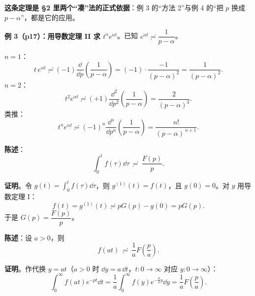 \documentclass[11pt]{ctexart}
\begin{document}
\textbf{这条定理是 §2 里两个“凑”法的正式依据}：例 3 的“方法 2”与例 4 的“把 $p$ 换成 $p-\alpha$”，都是它的应用。

\textbf{例 3（p17）：用导数定理 II 求 $t^{n}e^{\alpha t}$}。已知 $e^{\alpha t}\risingdotseq\dfrac{1}{p-\alpha}$。

$n=1$：
\[ t\,e^{\alpha t}\risingdotseq(-1)\frac{\dd}{\dd p}\left(\frac{1}{p-\alpha}\right)=(-1)\cdot\frac{-1}{(p-\alpha)^{2}}=\frac{1}{(p-\alpha)^{2}} .\]
$n=2$：
\[ t^{2}e^{\alpha t}\risingdotseq(+1)\frac{\dd^{2}}{\dd p^{2}}\left(\frac{1}{p-\alpha}\right)=\frac{2}{(p-\alpha)^{3}} .\]
类推：
\[ t^{n}e^{\alpha t}\risingdotseq(-1)^{n}\frac{\dd^{n}}{\dd p^{n}}\left(\frac{1}{p-\alpha}\right)=\frac{n!}{(p-\alpha)^{\,n+1}} .\]


\textbf{陈述}：
\[ \int_0^{t}f(\tau)\dd\tau\ \risingdotseq\ \frac{F(p)}{p} .\]

\textbf{证明}。令 $g(t)=\displaystyle\int_0^{t}f(\tau)\dd\tau$，则 $g^{(1)}(t)=f(t)$，且 $g(0)=0$。对 $g$ 用导数定理 I：
\[ f(t)=g^{(1)}(t)\risingdotseq pG(p)-g(0)=pG(p) .\]
于是 $G(p)=\dfrac{F(p)}{p}$。



\textbf{陈述}：设 $a>0$，则
\[ f(at)\ \risingdotseq\ \frac{1}{a}F\!\left(\frac{p}{a}\right) .\]

\textbf{证明}。作代换 $y=at$（$a>0$ 时 $\dd y=a\,\dd t$，$t:0\to\infty$ 对应 $y:0\to\infty$）：
\[
\int_0^{\infty}\! f(at)e^{-pt}\dd t
=\frac{1}{a}\int_0^{\infty}\! f(y)e^{-\frac{p}{a}y}\dd y
=\frac{1}{a}F\!\left(\frac{p}{a}\right) .
\]

\end{document}
